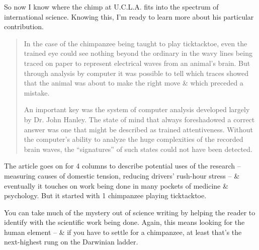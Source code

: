 \documentclass{article}
\begin{document}
So now I know where the chimp at U.C.L.A. fits into the spectrum of international science. Knowing this, I'm ready to learn more about his particular contribution.
\begin{quotation}
	In the case of the chimpanzee being taught to play ticktacktoe, even the trained eye could see nothing beyond the ordinary in the wavy lines being traced on paper to represent electrical waves from an animal's brain. But through analysis by computer it was possible to tell which traces showed that the animal was about to make the right move \& which preceded a mistake.
	
	An important key was the system of computer analysis developed largely by Dr. John Hanley. The state of mind that always foreshadowed a correct answer was one that might be described as trained attentiveness. Without the computer's ability to analyze the huge complexities of the recorded brain waves, the ``signatures'' of such states could not have been detected.
\end{quotation}
The article goes on for 4 columns to describe potential uses of the research -- measuring causes of domestic tension, reducing drivers' rush-hour stress -- \& eventually it touches on work being done in many pockets of medicine \& psychology. But it started with 1 chimpanzee playing ticktacktoe.

You can take much of the mystery out of science writing by helping the reader to identify with the scientific work being done. Again, this means looking for the human element -- \& if you have to settle for a chimpanzee, at least that's the next-highest rung on the Darwinian ladder.
\end{document}
